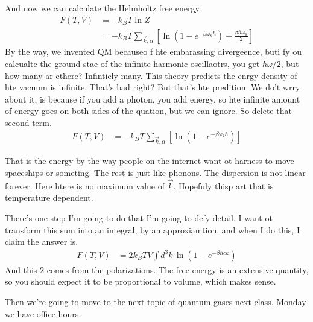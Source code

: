 And now we can calculate the Helmholtz free energy.
\begin{align}
    F(T, V) &=
    -k_B T \ln Z\\
    &=
    -k_B T \sum_{\vec{k},\alpha}\left[ 
    \ln\left( 1 - e^{-\beta\omega_k\hbar} \right)
    + \frac{\beta\hbar\omega_k}{2}
    \right]
\end{align}
By the way,
we invented QM becauseo f hte embarassing divergeence,
buti fy ou calcualte the ground stae of the infinite harmonic oscillaotrs,
you get $\hbar\omega/2$,
but how many ar ethere?
Infintiely many.
This theory predicts the enrgy density of hte vacuum is infinite.
That's bad right?
But that's hte predition.
We do't wrry about it,
is because if you add a photon,
you add energy,
so hte infinite amount of energy goes on both sides of the quation,
but we can ignore.
So delete that second term.
\begin{align}
    F(T, V) &=
    -k_B T \sum_{\vec{k},\alpha}\left[ 
    \ln\left( 1 - e^{-\beta\omega_k\hbar} \right)
    \right]
\end{align}

That is the energy by the way people on the internet want ot harness to move
spaceships or someting.
The rest is just like phonons.
The dispersion is not linear forever.
Here htere is no maximum value of $\vec{k}$.
Hopefuly thisp art that is temperature dependent.

There's one step I'm going to do that I'm going to defy detail.
I want ot transform this sum into an integral,
by an approxiamtion,
and when I do this,
I claim the answer is.
\begin{align}
    F(T, V) &=
    2k_B T V \int d^3k\, \ln\left( 1 - e^{-\beta \hbar ck} \right)
\end{align}
And this $2$ comes from the polarizations.
The free energy is an extensive quantity,
so you should expect it to be proportional to volume,
which makes sense.

Then we're going to move to the next topic of quantum gases next class.
Monday we have office hours.
